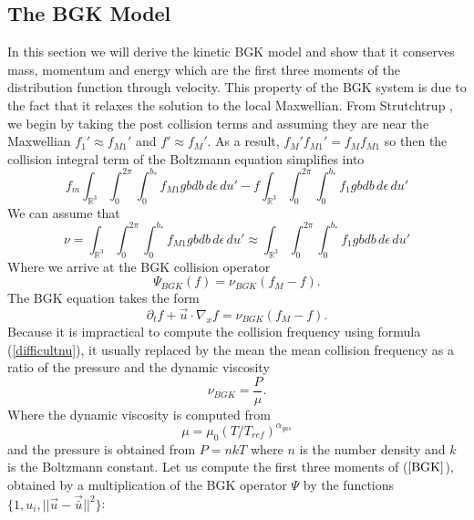 \subsection{The BGK Model}
In this section we will derive the kinetic BGK model and show that it conserves mass, momentum and energy which are the first three moments of the distribution function through velocity. This property of the BGK system is due to the fact that it relaxes the solution to the local Maxwellian. From Strutchtrup \cite{struchtrup}, we begin by taking the post collision terms and assuming they are near the Maxwellian $f_1' \approx f_{M 1}'$ and $f' \approx f_M'$. As a result, $f_M' f_{M1}' = f_M f_{M1}$ so then the collision integral term of the Boltzmann equation simplifies into
\begin{equation*}
f_m \int_{\mathbb{R}^3} \int_0^{2 \pi} \int_0^{b_*} f_{M1} g b db \, d\epsilon \, du' - f \int_{\mathbb{R}^3} \int_0^{2 \pi} \int_0^{b_*} f_1 g b db \, d\epsilon \, du'
\end{equation*}
%
We can assume that
\begin{equation*}
\label{difficultnu}
\nu = \int_{\mathbb{R}^3} \int_0^{2 \pi} \int_0^{b_*} f_{M1} g b db \, d\epsilon \, du' \approx \int_{\mathbb{R}^3} \int_0^{2 \pi} \int_0^{b_*} f_1 g b db \, d\epsilon \, du'
\end{equation*}
%
Where we arrive at the BGK collision operator
\begin{equation}
\label{BGK}
\Psi_{BGK}(f) = \nu_{BGK} \left(f_M - f \right).
\end{equation}
%
The BGK equation takes the form
%
\begin{equation}
\label{BGKeq}
\partial_t f + \vec{u} \cdot \nabla_x f = \nu_{BGK} \left(f_M - f \right).
\end{equation}
%
Because it is impractical to compute the collision frequency using formula (\ref{difficultnu}), it usually replaced by the mean the mean collision frequency as a ratio of the pressure and the dynamic viscosity
\begin{equation}
\label{collision}
\nu_{BGK} = \frac{P}{\mu}.
\end{equation}
%
Where the dynamic viscosity is computed from
\begin{equation}
\mu = \mu_0 (T/T_{ref})^{\alpha_{gas}}
\end{equation}
%
and the pressure is obtained from $P = n k T$ where $n$ is the number density and $k$ is the Boltzmann constant. Let us compute the first three moments of ($\ref{BGK}$), obtained by a multiplication of the BGK operator $\Psi$ by the functions $\{ 1, u_i, ||\vec{u} - \vec{\bar{u}}||^2 \}$:
